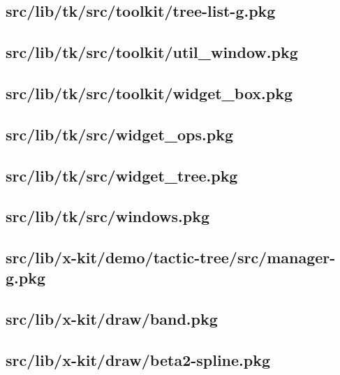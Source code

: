 \subsection{src/lib/tk/src/toolkit/tree-list-g.pkg}


\subsection{src/lib/tk/src/toolkit/util\_window.pkg}


\subsection{src/lib/tk/src/toolkit/widget\_box.pkg}


\subsection{src/lib/tk/src/widget\_ops.pkg}


\subsection{src/lib/tk/src/widget\_tree.pkg}


\subsection{src/lib/tk/src/windows.pkg}


\subsection{src/lib/x-kit/demo/tactic-tree/src/manager-g.pkg}


\subsection{src/lib/x-kit/draw/band.pkg}


\subsection{src/lib/x-kit/draw/beta2-spline.pkg}


